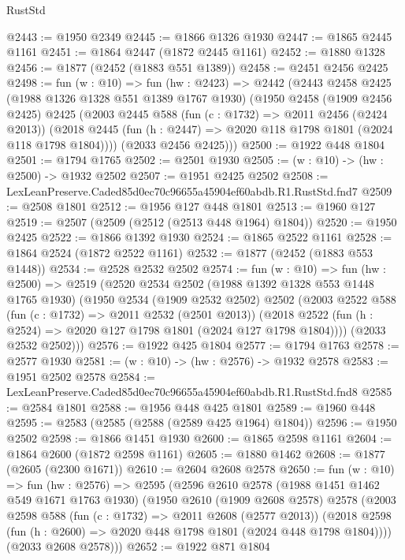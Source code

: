 \begin{lexlean}{RustStd}
\begin{coremodule}
@2443 := @1950 @2349
@2445 := @1866 @1326 @1930
@2447 := @1865 @2445 @1161
@2451 := @1864 @2447 (@1872 @2445 @1161)
@2452 := @1880 @1328
@2456 := @1877 (@2452 (@1883 @551 @1389))
@2458 := @2451 @2456 @2425
@2498 := fun (w : @10) =>
  fun (hw : @2423) =>
  @2442
    (@2443
      @2458
      @2425
      (@1988 @1326 @1328 @551 @1389 @1767 @1930)
      (@1950
        @2458
        (@1909 @2456 @2425)
        @2425
        (@2003
          @2445
          @588
          (fun (c : @1732) => @2011 @2456 (@2424 @2013))
          (@2018 @2445 (fun (h : @2447) => @2020 @118 @1798 @1801 (@2024 @118 @1798 @1804))))
        (@2033 @2456 @2425)))
@2500 := @1922 @448 @1804
@2501 := @1794 @1765
@2502 := @2501 @1930
@2505 := (w : @10) -> (hw : @2500) -> @1932 @2502
@2507 := @1951 @2425 @2502
@2508 := LexLeanPreserve.Caded85d0ec70c96655a45904ef60abdb.R1.RustStd.fnd7
@2509 := @2508 @1801
@2512 := @1956 @127 @448 @1801
@2513 := @1960 @127
@2519 := @2507 (@2509 (@2512 (@2513 @448 @1964) @1804))
@2520 := @1950 @2425
@2522 := @1866 @1392 @1930
@2524 := @1865 @2522 @1161
@2528 := @1864 @2524 (@1872 @2522 @1161)
@2532 := @1877 (@2452 (@1883 @553 @1448))
@2534 := @2528 @2532 @2502
@2574 := fun (w : @10) =>
  fun (hw : @2500) =>
  @2519
    (@2520
      @2534
      @2502
      (@1988 @1392 @1328 @553 @1448 @1765 @1930)
      (@1950
        @2534
        (@1909 @2532 @2502)
        @2502
        (@2003
          @2522
          @588
          (fun (c : @1732) => @2011 @2532 (@2501 @2013))
          (@2018 @2522 (fun (h : @2524) => @2020 @127 @1798 @1801 (@2024 @127 @1798 @1804))))
        (@2033 @2532 @2502)))
@2576 := @1922 @425 @1804
@2577 := @1794 @1763
@2578 := @2577 @1930
@2581 := (w : @10) -> (hw : @2576) -> @1932 @2578
@2583 := @1951 @2502 @2578
@2584 := LexLeanPreserve.Caded85d0ec70c96655a45904ef60abdb.R1.RustStd.fnd8
@2585 := @2584 @1801
@2588 := @1956 @448 @425 @1801
@2589 := @1960 @448
@2595 := @2583 (@2585 (@2588 (@2589 @425 @1964) @1804))
@2596 := @1950 @2502
@2598 := @1866 @1451 @1930
@2600 := @1865 @2598 @1161
@2604 := @1864 @2600 (@1872 @2598 @1161)
@2605 := @1880 @1462
@2608 := @1877 (@2605 (@2300 @1671))
@2610 := @2604 @2608 @2578
@2650 := fun (w : @10) =>
  fun (hw : @2576) =>
  @2595
    (@2596
      @2610
      @2578
      (@1988 @1451 @1462 @549 @1671 @1763 @1930)
      (@1950
        @2610
        (@1909 @2608 @2578)
        @2578
        (@2003
          @2598
          @588
          (fun (c : @1732) => @2011 @2608 (@2577 @2013))
          (@2018 @2598 (fun (h : @2600) => @2020 @448 @1798 @1801 (@2024 @448 @1798 @1804))))
        (@2033 @2608 @2578)))
@2652 := @1922 @871 @1804

\end{coremodule}
\end{lexlean}
